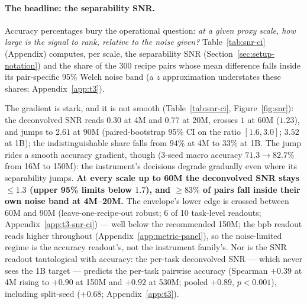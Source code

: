 \paragraph{The headline: the separability SNR.}
\label{sec:t3-snr}
Accuracy percentages bury the operational question: \emph{at a given proxy scale, how large is
the signal to rank, relative to the noise given?} Table~\ref{tab:snr-ci} (Appendix)
computes, per scale, the separability SNR
(Section~\ref{sec:setup-notation}) and the share of the 300 recipe pairs whose mean
difference falls inside its pair-specific 95\% Welch noise band (a $z$ approximation
understates these shares; Appendix~\ref{app:t3}).



The gradient is stark, and it is not smooth (Table~\ref{tab:snr-ci}, Figure~\ref{fig:snr}): the
deconvolved SNR reads $0.30$ at
4M and $0.77$ at 20M, crosses $1$ at 60M ($1.23$), and jumps to $2.61$ at 90M
(paired-bootstrap 95\% CI on the ratio $[1.6, 3.0]$; $3.52$ at 1B); the
indistinguishable share falls from $94\%$ at 4M to $33\%$ at 1B. The jump rides a
smooth accuracy gradient, though (3-seed macro accuracy $71.3 \to 82.7\%$ from 16M to 150M): the instrument's decisions degrade
gradually even where its separability jumps. \textbf{At every scale up to 60M the
deconvolved SNR stays $\le 1.3$ (upper 95\% limits below $1.7$), and ${\ge}83\%$ of pairs fall
inside their own noise band at 4M--20M.} The envelope's lower edge is crossed
between 60M and 90M (leave-one-recipe-out robust; 6 of 10 task-level readouts; Appendix~\ref{app:t3-snr-ci}) --- well below the recommended
150M; the bpb readout reads higher
throughout (Appendix~\ref{app:metric-panel}), so the
noise-limited regime is the accuracy readout's, not the instrument family's. Nor is the SNR readout tautological
with accuracy: the per-task deconvolved SNR --- which never sees the 1B
target --- predicts the per-task pairwise accuracy (Spearman $+0.39$ at 4M rising to $+0.90$ at 150M and
$+0.92$ at 530M; pooled $+0.89$, $p<0.001$), including split-seed ($+0.68$; Appendix~\ref{app:t3}).

